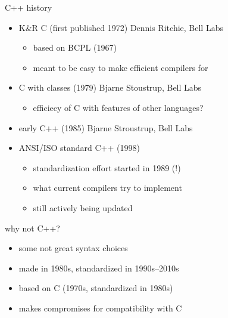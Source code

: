\begin{frame}[fragile,label=cppHist]{C++ history}
\begin{itemize}
\item K\&R C (first published 1972) {\small Dennis Ritchie, Bell Labs}
    \begin{itemize}
    \item based on BCPL (1967)
    \item meant to be easy to make efficient compilers for
    \end{itemize}
\item C with classes (1979) {\small Bjarne Stoustrup, Bell Labs}
    \begin{itemize}
    \item efficiecy of C with features of other languages?
    \end{itemize}
\item early C++ (1985) {\small Bjarne Stroustrup, Bell Labs}
\item ANSI/ISO standard C++ (1998)
    \begin{itemize}
    \item standardization effort started in 1989 (!)
    \item what current compilers try to implement
    \item still actively being updated
    \end{itemize}
\end{itemize}
\end{frame}

\begin{frame}{why not C++?}
    \begin{itemize}
    \item some not great syntax choices
    \item made in 1980s, standardized in 1990s--2010s
    \item based on C (1970s, standardized in 1980s)
    \item makes compromises for compatibility with C
    \end{itemize}
\end{frame}
